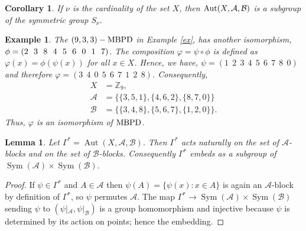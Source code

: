\documentclass[preprint,11pt]{elsarticle}
\newcommand{\MBPD}{\textnormal{MBPD}}
\newtheorem{lemma}[theorem]{Lemma}
\newtheorem{corollary}[theorem]{Corollary}
\newtheorem{example}[theorem]{Example}
\begin{document}
\begin{corollary}{\label{cor3}}
   If $\nu$ is the cardinality of the set $X$, then $\textnormal{Aut}(X,\mathcal{A}, \mathcal{B})$ is a subgroup of the symmetric group $S_{\nu}$.
\end{corollary}
\begin{example}
    The $(9,3,3)-\MBPD$ in Example \textnormal{\ref{ex}},
has another isomorphism, $\phi=(2~~ 3 ~~8~~4~~5\\~~6~~0~~1~~7)$. The composition $\varphi=\psi \circ \phi$ is defined as $\varphi(x)=\phi(\psi(x))$ for all $x\in X$. Hence, we have, 
$\psi=(1~~2~~3~~4~~5~~6~~7~~8~~0)$ and therefore $\varphi=(3~~4~~0~~5~~6~~7~~1~~2~~8)$. Consequently, 
\begin{align*}
 X&  =\mathbb{Z}_{9},\\ 
    \mathcal{A} &  =\{\{3,5,1\}, \{4,6,2\},\{8,7,0\}\}\\
    \mathcal{B} &  = \{\{3,4,8\}, \{5,6,7\},\{1,2,0\} \}.
\end{align*}
\noindent Thus,
$\varphi$ is an isomorphism of $\MBPD$. \end{example}




\begin{lemma}
\label{lem:aut-action-blocks}
Let $\Gamma^*=\operatorname{Aut}(X,\mathcal{A},\mathcal{B})$. Then $\Gamma^*$ acts naturally on the set of $\mathcal{A}$-blocks and on the set of $\mathcal{B}$-blocks. Consequently $\Gamma^*$ embeds as a subgroup of $\operatorname{Sym}(\mathcal{A})\times\operatorname{Sym}(\mathcal{B})$.
\end{lemma}

\begin{proof}
If $\psi\in \Gamma^*$ and $A\in\mathcal{A}$ then $\psi(A)=\{\psi(x):x\in A\}$ is again an $\mathcal{A}$-block by definition of $\Gamma^*$, so $\psi$ permutes $\mathcal{A}$. The map $\Gamma^*\to\operatorname{Sym}(\mathcal{A})\times\operatorname{Sym}(\mathcal{B})$ sending $\psi$ to $(\psi|_{\mathcal{A}},\psi|_{\mathcal{B}})$ is a group homomorphism and injective because $\psi$ is determined by its action on points; hence the embedding.
\end{proof}
\end{document}
